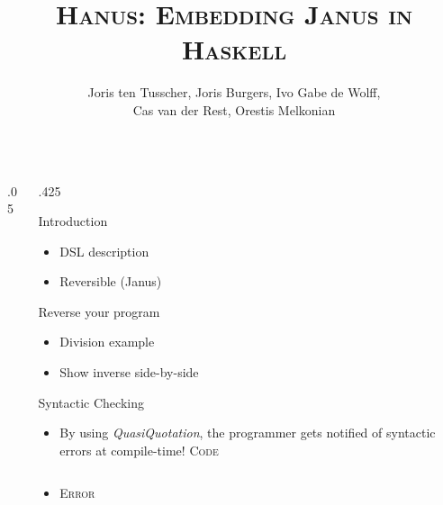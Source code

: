 \documentclass[final,hyperref={pdfpagelabels=false}]{beamer}
\title{\LARGE \textsc{Hanus: Embedding Janus in Haskell}} %
\author{\vspace{1cm} Joris ten Tusscher, Joris Burgers, Ivo Gabe de Wolff,\\ Cas van der Rest, Orestis Melkonian\vspace{1cm}} %
\institute{\Large \emph{Faculty of Science, Utrecht University}} %
\newcommand\sepsize{.05\textwidth}
\newcommand\colsize{.425\textwidth}
\newcommand{\code}[1]{\inputminted[frame=lines,framesep=1cm,baselinestretch=.9,linenos,fontsize=\scriptsize]{haskell}{code/#1.hs}}
\newcommand{\codeErr}[1]{\inputminted[frame=lines,framesep=1cm,baselinestretch=.9,fontsize=\scriptsize]{bash}{code/#1_err.hs}}
\begin{document}

\begin{frame}[t] %

\begin{columns}[t] %

\begin{column}{\sepsize}\end{column} %

\begin{column}{\colsize} %

            
\begin{block}{Introduction}
	\begin{itemize}
		\item DSL description
		\item Reversible (Janus)
	\end{itemize}
\end{block}

\begin{block}{Reverse your program}
	\begin{itemize}
		\item Division example
		\item Show inverse side-by-side
	\end{itemize}
\end{block}

\begin{block}{Syntactic Checking}
	\begin{itemize}
		\item By using \textit{QuasiQuotation}, the programmer gets notified of syntactic errors at compile-time!
	\center
	\textsc{\small Code}\\ \vspace{1cm}
	\begin{minipage}{.8\textwidth}
	\code{syntax}
	\end{minipage}
	\vspace{1cm}
	\item \textsc{\small Error}\\ \vspace{1cm}
	\begin{minipage}{.8\textwidth}
	\codeErr{syntax}
	\end{minipage}	
	\end{itemize}
\end{block}


\end{column}
\end{columns}
\end{frame}
\end{document}
